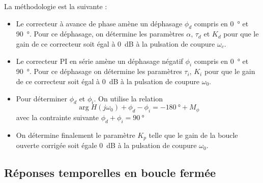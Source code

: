 La méthodologie est la suivante :
\begin{itemize}
    \item Le correcteur à avance de phase amène un déphasage $\phi_d$ compris 
          en \SI{0}{\degree} et \SI{90}{\degree}. 
          Pour ce déphasage, on détermine les paramètres $\alpha$, $\tau_d$ et 
          $K_d$ pour que le gain de ce correcteur soit égal à \SI{0}{\dB} 
          à la pulsation de coupure $\omega_c$.
    \item Le correcteur PI en série amène un déphasage négatif $\phi_i$ compris 
          en \SI{0}{\degree} et \SI{90}{\degree}.
          Pour ce déphasage on détermine les paramètres $\tau_i$, $K_i$ pour 
          que le gain de ce correcteur soit égal à \SI{0}{\dB} à la 
          pulsation de coupure $\omega_0$.
    \item Pour déterminer $\phi_d$ et $\phi_i$. On utilise la relation 
        \[
            \arg{H(j\omega_0)} + \phi_d - \phi_i = -\SI{180}{\degree} + M_\phi
        \]
          avec la contrainte suivante $\phi_d + \phi_i = \SI{90}{\degree}$
    \item On détermine finalement le paramètre $K_p$ telle que le gain de la 
          boucle ouverte corrigée soit égale \SI{0}{\dB} 
          à la pulsation de coupure $\omega_0$.
\end{itemize}



\subsection*{Réponses temporelles en boucle fermée}

